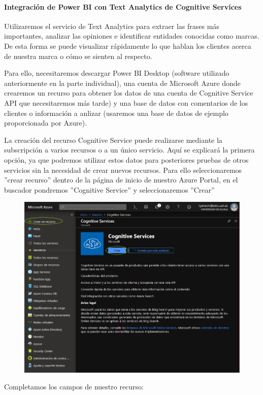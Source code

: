 \documentclass[runningheads]{llncs}
\begin{document}
	\paragraph{Integración de Power BI con Text Analytics de Cognitive Services}
	Utilizaremos el servicio de Text Analytics para extraer las frases más importantes, analizar las opiniones e identificar entidades conocidas como marcas. De esta forma se puede visualizar rápidamente lo que hablan los clientes acerca de nuestra marca o cómo se sienten al respecto.
	
	Para ello, necesitaremos descargar Power BI Desktop (software utilizado anteriormente en la parte individual), una cuenta de Microsoft Azure donde crearemos un recurso para obtener los datos de una cuenta de Cognitive Service API que necesitaremos más tarde) y una base de datos con comentarios de los clientes o información a anlizar (usaremos una base de datos de ejemplo proporcionada por Azure).
	
	La creación del recurso Cognitive Service puede realizarse mediante la subscripción a varios recursos o a un único servicio. Aquí se explicará la primera opción, ya que podremos utilizar estos datos para posteriores pruebas de otros servicios sin la necesidad de crear nuevos recursos. Para ello seleccionaremos ''crear recurso'' dentro de la página de inicio de nuestro Azure Portal, en el buscador pondremos ''Cognitive Service'' y seleccionaremos ''Crear''
	
	\begin{figure}[H]
		
		\includegraphics[scale = 0.25]{./IA/AZURE/crearRecursoCS.png}
	\end{figure}
	\newpage Completamos los campos de nuestro recurso:
	
\end{document}
